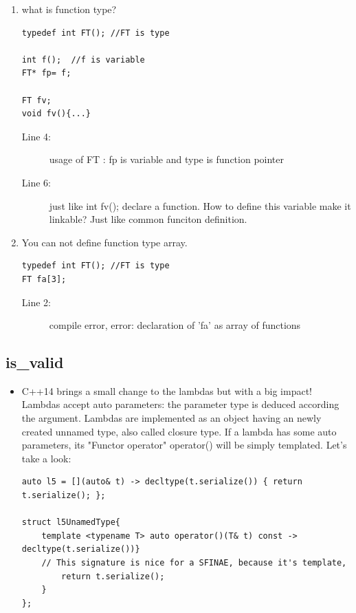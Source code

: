 \documentclass[a4paper,11pt,twoside]{book}
\begin{document}
\begin{itemize}
\begin{enumerate}
	\item what is function type?
\begin{lstlisting}
typedef int FT(); //FT is type

int f();  //f is variable
FT* fp= f; 

FT fv; 
void fv(){...} 
\end{lstlisting}
	\begin{description}
		\item[Line 4:] usage of FT : fp is variable and type is function pointer
		\item[Line 6:] just like int fv(); declare a function. How to define this variable make it linkable? Just like common funciton definition.
	\end{description}
	
	\item You can not define function type array.
\begin{lstlisting}
typedef int FT(); //FT is type
FT fa[3]; 
\end{lstlisting}
	\begin{description}
		\item[Line 2:] compile error, error: declaration of 'fa' as array of functions
	\end{description}
\end{enumerate}

\subsection{is\_valid}

\begin{itemize}
	\item C++14 brings a small change to the lambdas but with a big impact! Lambdas accept auto parameters: the parameter type is deduced according the argument. Lambdas are implemented as an object having an newly created unnamed type, also called closure type. If a lambda has some auto parameters, its "Functor operator" operator() will be simply templated. Let's take a look:
	
\begin{lstlisting}[numbers=none]
auto l5 = [](auto& t) -> decltype(t.serialize()) { return t.serialize(); };

struct l5UnamedType{
	template <typename T> auto operator()(T& t) const -> decltype(t.serialize())} 
	// This signature is nice for a SFINAE, because it's template, 
		return t.serialize();
	}
};	
\end{lstlisting}
	

\end{itemize}
\end{itemize}
\end{document}
